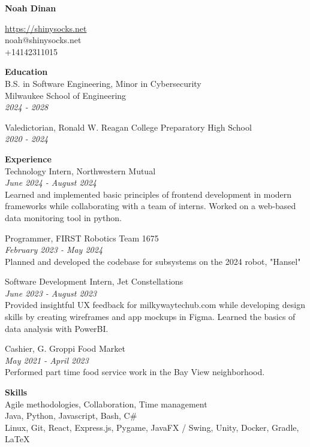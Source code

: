 \documentclass[10pt]{article}
\begin{document}
{\fontsize{19pt}{0pt}\selectfont \textbf{Noah Dinan}}

\href{https://shinysocks.net}{https://shinysocks.net}\\
noah@shinysocks.net\\
+14142311015

{\fontsize{11pt}{0pt}\selectfont \textbf{Education}}\\
B.S. in Software Engineering, Minor in Cybersecurity\\
Milwaukee School of Engineering\\
\textit{2024 - 2028}

Valedictorian, Ronald W. Reagan College Preparatory High School\\
\textit{2020 - 2024}

{\fontsize{11pt}{0pt}\selectfont \textbf{Experience}}\\
Technology Intern, Northwestern Mutual\\
\textit{June 2024 - August 2024}\\
Learned and implemented basic principles of frontend development in modern frameworks while
collaborating with a team of interns. Worked on a web-based data monitoring tool in python.

Programmer, FIRST Robotics Team 1675\\
\textit{February 2023 - May 2024}\\
Planned and developed the codebase for subsystems on the 2024 robot, "Hansel"

Software Development Intern, Jet Constellations\\
\textit{June 2023 - August 2023}\\
Provided insightful UX feedback for milkywaytechub.com while developing design skills by
creating wireframes and app mockups in Figma. Learned the basics of data analysis with PowerBI.

Cashier, G. Groppi Food Market\\
\textit{May 2021 - April 2023}\\
Performed part time food service work in the Bay View neighborhood.

{\fontsize{11pt}{0pt}\selectfont \textbf{Skills}}\\
Agile methodologies, Collaboration, Time management\\
Java, Python, Javascript, Bash, C\#\\
Linux, Git, React, Express.js, Pygame, JavaFX / Swing, Unity, Docker, Gradle, LaTeX
\end{document}

